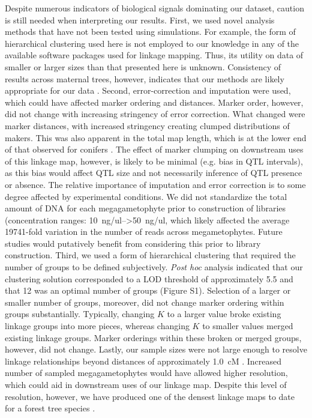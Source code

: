 \documentclass[smallextended]{svjour3}
\begin{document}
Despite numerous indicators of biological signals dominating our dataset, 
caution is still needed when interpreting our results. First, we used novel analysis
methods that have not been tested using simulations. For example, the form of
hierarchical clustering used here is not employed to our knowledge in any of the
available software packages used for linkage mapping. Thus, its utility on data
of smaller or larger sizes than that presented here is unknown. Consistency of
results across maternal trees, however, indicates that our methods are likely
appropriate for our data \citep[see also][]{Tani:2003}. Second, error-correction
and imputation were used, which could have affected marker ordering and
distances. Marker order, however, did not change with increasing stringency of
error correction. What changed were marker distances, with increased stringency
creating clumped distributions of makers. This was also apparent in the total
map length, which is at the lower end of that observed for conifers
\citep[cf.,][]{Ritland:2011}. The effect of marker clumping on downstream uses
of this linkage map, however, is likely to be minimal (e.g. bias in QTL
intervals), as this bias would affect QTL size and not necessarily inference of
QTL presence or absence. The relative importance of imputation and error
correction is to some degree affected by experimental conditions.  We did
not standardize the total amount of DNA for each megagametophyte prior to
construction of libraries (concentration ranges: \SIrange{10}{>50}{ng/ul},
which likely affected the average \num{19741}-fold variation in the number of reads
across megametophytes. Future studies would putatively benefit from considering
this prior to library construction. Third, we used a form of hierarchical
clustering that required the number of groups to be defined
subjectively. \textit{Post hoc} analysis indicated that our clustering solution
corresponded to a LOD threshold of approximately 5.5 and that 12 was an
optimal number of groups (Figure S1). Selection of a larger or smaller number of
groups, moreover, did not change marker ordering within groups substantially.
Typically, changing $K$ to a larger value broke existing linkage groups
into more pieces, whereas changing $K$ to smaller values merged existing linkage
groups. Marker orderings within these broken or merged groups, however, did not
change.  Lastly, our sample sizes were not large enough to resolve linkage
relationships beyond distances of approximately \SI{1.0}{cM} \citep[but
see][]{Neves:2014}. Increased number of sampled megagametophytes would have
allowed higher resolution, which could aid in downstream uses of our linkage
map. Despite this level of resolution, however, we have produced one of the
densest linkage maps to date for a forest tree species \citep{Eckert:2010b,
  Martinez-Garcia:2013, Neves:2014}.
\end{document}
